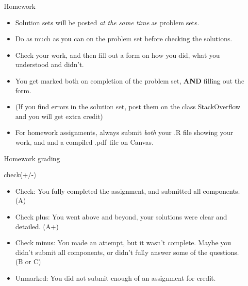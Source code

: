 \documentclass[xcolor={dvipsnames}, handout]{beamer}
\begin{document}
\begin{frame}{Homework}

\begin{itemize}
\item Solution sets will be posted \textit{at the same time} as problem sets. \pause
\item Do as much as you can on the problem set before checking the solutions. \pause
\item Check your work, and then fill out a form on how you did, what you understood and didn't.\pause
\item You get marked both on completion of the problem set, \textbf{AND} filling out the form.\pause
\item (If you find errors in the solution set, post them on the class StackOverflow and you will get extra credit) \pause
\item For homework assignments, always submit \textit{both} your .R file showing your work, and and a compiled .pdf\ file on Canvas.
\end{itemize}

\end{frame}




\begin{frame}{Homework grading}

check(+/-) \pause
\begin{itemize}
\item Check: You fully completed the assignment, and submitted all components. (A) \pause
\item Check plus: You went above and beyond, your solutions were clear and detailed. (A+)  \pause
\item Check minus: You made an attempt, but it wasn't complete. Maybe you didn't submit all components, or didn't fully answer some of the questions. (B or C) \pause
\item Unmarked: You did not submit enough of an assignment for credit. 
\end{itemize}

\end{frame}
\end{document}
